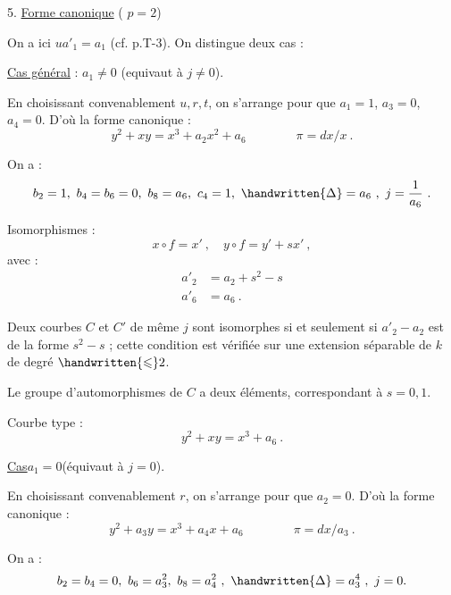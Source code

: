 
5. \uline{Forme canonique} ( $p=2$)

On a ici $ua'_{1}=a_{1}$ (cf. p.T-3). On distingue deux cas :

\uline{Cas général} : $a_{1}\ne 0$ (equivaut à $j\ne 0$).

En choisissant convenablement $u,r,t$, on s'arrange pour que $a_{1}=1$, $a_{3}=0$, $a_{4}=0$. D'où la forme canonique :
\[
 y^{2}+xy=x^{3}+a_{2}x^{2}+a_{6}\qquad\qquad \pi=dx/x\ .
\]

On a :
\[
 b_{2}=1,\ b_{4}=b_{6}=0,\ b_{8}=a_{6},\ c_{4}=1,\ \handwritten{\Delta}=a_{6}\ ,\
 j=\frac{1}{a_{6}}\ .
\]

Isomorphismes :
\[
 x\circ f=x'\ ,\quad y\circ f=y'+sx'\ ,
\]
avec :
\[
\begin{aligned}
 a'_{2}&=a_{2}+s^{2}-s\\
 a'_{6}&=a_{6}\ .
\end{aligned}
\]

Deux courbes $C$ et $C'$ de même $j$ sont isomorphes si et seulement si $a'_{2}-a_{2}$ est de la forme $s^{2}-s$ ; cette condition est vérifiée sur une extension séparable de $k$ de degré $\handwritten{\leqslant}2$.

Le groupe d'automorphismes de $C$ a deux éléments, correspondant à $s=0,1$.

Courbe type :
\[
 y^{2}+xy=x^{3}+a_{6}\ .
\]

\uline{Cas}\quad $a_{1}=0$\quad (équivaut à $j=0$).

En choisissant convenablement $r$, on s'arrange pour que $a_{2}=0$. D'où la forme canonique :
\[
 y^{2}+a_{3}y=x^{3}+a_{4}x+a_{6}\qquad\qquad \pi=dx/a_{3}\ .
\]

On a :
\[
 b_{2}=b_{4}=0,\ b_{6}=a_{3}^{2},\ b_{8}=a_{4}^{2}\ ,\
 \handwritten{\Delta}=a_{3}^{4}\ ,\ j=0.
\]

